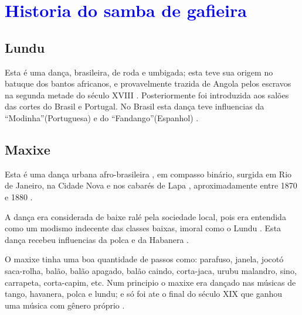 

\chapter{\textcolor{blue}{Historia do samba de gafieira}}
\label{cap:sambagafieira}


\section{Lundu} 
\label{sec:lundu}
Esta é uma dança, brasileira, de roda e umbigada; esta teve sua origem no batuque dos bantos africanos,
e provavelmente trazida de Angola pelos escravos na segunda metade do século XVIII \cite[pp. 198]{dourado2004dicionario}.
Posteriormente foi introduzida aos salões das cortes do Brasil e Portugal.
No Brasil esta dança teve influencias da ``Modinha''(Portuguesa) e do ``Fandango''(Espanhol) \cite[pp. 198]{dourado2004dicionario}.



\section{Maxixe}
\label{sec:maxixe}
Esta é uma dança urbana afro-brasileira \cite[pp. 4]{musicasambavariasdef1}, 
em compasso binário, surgida em Rio de Janeiro, 
na Cidade Nova e nos cabarés de Lapa \cite[pp. 465]{marcondes1977enciclopedia}  \cite[pp. 198]{dourado2004dicionario}, 
aproximadamente entre 1870 e 1880 \cite[pp. 465]{marcondes1977enciclopedia}  \cite[pp. 62]{reinato2010musica}.

A dança era considerada de baixe ralé pela sociedade local, 
pois era entendida como um modismo indecente das classes baixas, imoral como o Lundu \cite[pp. 198]{dourado2004dicionario}.
Esta dança recebeu influencias da polca \cite[pp. 198]{dourado2004dicionario} e da Habanera \cite[pp. 62]{reinato2010musica}.

O maxixe tinha uma boa quantidade de passos como: 
parafuso, 
janela,
jocotó
saca-rolha, 
balão, 
balão apagado,
balão caindo,
corta-jaca,
urubu malandro,
sino, 
carrapeta, 
corta-capim, 
\cite[pp. 465]{marcondes1977enciclopedia} \cite[pp. 68, 129, 131,173]{efege1974maxixe} etc. 
Num principio o maxixe era dançado nas músicas de tango, havanera, polca e lundu; 
e só foi ate o final do século XIX que ganhou uma música com gênero próprio \cite[pp. 465]{marcondes1977enciclopedia}.

